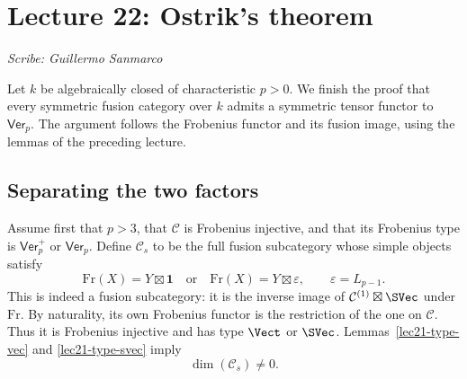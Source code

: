 \section{Lecture 22: Ostrik's theorem}
\label{lec22}
\noindent\textit{Scribe: Guillermo Sanmarco}

Let $k$ be algebraically closed of characteristic $p>0$.
We finish the proof that every symmetric fusion category over $k$ admits
a symmetric tensor functor to $\mathsf{Ver}_p$. The argument follows the
Frobenius functor and its fusion image, using the lemmas of the preceding
lecture.

\subsection{Separating the two factors}
Assume first that $p>3$, that $\mathcal C$ is Frobenius injective, and that
its Frobenius type is $\mathsf{Ver}_p^+$ or $\mathsf{Ver}_p$.
Define $\mathcal C_s$ to be the full fusion subcategory whose simple
objects satisfy
\[
 \mathrm{Fr}(X)=Y\boxtimes\mathbf1
 \quad\text{or}\quad
 \mathrm{Fr}(X)=Y\boxtimes\varepsilon,
 \qquad \varepsilon=L_{p-1}.
\]
This is indeed a fusion subcategory: it is the inverse image of
$\mathcal C^{(1)}\boxtimes\SVec$ under $\mathrm{Fr}$.
By naturality, its own Frobenius functor is the restriction of the one on
$\mathcal C$. Thus it is Frobenius injective and has type $\Vect$ or
$\SVec$. Lemmas~\ref{lec21-type-vec} and \ref{lec21-type-svec} imply
\begin{equation}\label{lec22-cs-nondegenerate}
 \dim(\mathcal C_s)\ne0.
\end{equation}

